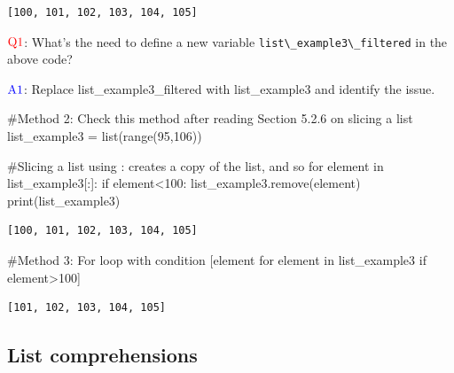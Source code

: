 \documentclass[
  letterpaper,
  DIV=11,
  numbers=noendperiod]{scrreprt}
\newenvironment{Shaded}{\begin{snugshade}}{\end{snugshade}}
\newcommand{\BuiltInTok}[1]{\textcolor[rgb]{0.00,0.23,0.31}{#1}}
\newcommand{\CommentTok}[1]{\textcolor[rgb]{0.37,0.37,0.37}{#1}}
\newcommand{\ControlFlowTok}[1]{\textcolor[rgb]{0.00,0.23,0.31}{#1}}
\newcommand{\DecValTok}[1]{\textcolor[rgb]{0.68,0.00,0.00}{#1}}
\newcommand{\KeywordTok}[1]{\textcolor[rgb]{0.00,0.23,0.31}{#1}}
\newcommand{\NormalTok}[1]{\textcolor[rgb]{0.00,0.23,0.31}{#1}}
\newcommand{\OperatorTok}[1]{\textcolor[rgb]{0.37,0.37,0.37}{#1}}
\begin{document}
\begin{verbatim}
[100, 101, 102, 103, 104, 105]
\end{verbatim}

\(\color{red}{\text{Q1}}\): What's the need to define a new variable
\texttt{list\textbackslash{}\_example3\textbackslash{}\_filtered} in the
above code?

\(\color{blue}{\text{A1}}\): Replace list\_example3\_filtered with
list\_example3 and identify the issue.

\begin{Shaded}
\begin{Highlighting}[]
\CommentTok{\#Method 2: Check this method after reading Section 5.2.6 on slicing a list}
\NormalTok{list\_example3 }\OperatorTok{=} \BuiltInTok{list}\NormalTok{(}\BuiltInTok{range}\NormalTok{(}\DecValTok{95}\NormalTok{,}\DecValTok{106}\NormalTok{))}

\CommentTok{\#Slicing a list using \textquotesingle{}:\textquotesingle{} creates a copy of the list, and so }
\ControlFlowTok{for}\NormalTok{ element }\KeywordTok{in}\NormalTok{ list\_example3[:]:}
    \ControlFlowTok{if}\NormalTok{ element}\OperatorTok{\textless{}}\DecValTok{100}\NormalTok{:}
\NormalTok{        list\_example3.remove(element)}
\BuiltInTok{print}\NormalTok{(list\_example3)}
\end{Highlighting}
\end{Shaded}

\begin{verbatim}
[100, 101, 102, 103, 104, 105]
\end{verbatim}

\begin{Shaded}
\begin{Highlighting}[]
\CommentTok{\#Method 3: For loop with condition}
\NormalTok{[element }\ControlFlowTok{for}\NormalTok{ element }\KeywordTok{in}\NormalTok{ list\_example3 }\ControlFlowTok{if}\NormalTok{ element}\OperatorTok{\textgreater{}}\DecValTok{100}\NormalTok{]}
\end{Highlighting}
\end{Shaded}

\begin{verbatim}
[101, 102, 103, 104, 105]
\end{verbatim}

\hypertarget{list-comprehensions}{%
\subsection{List comprehensions}\label{list-comprehensions}}
\end{document}
